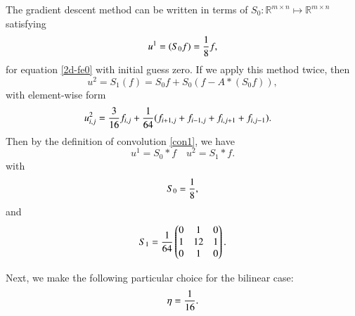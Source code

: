 The gradient descent method can be written in terms of $S_{0}:\mathbb
R^{m\times n}\mapsto \mathbb R^{m\times n}$ satisfying
\begin{equation}
\label{jacobi1}
u^1=(S_{0}f)={1\over 8} f,
\end{equation}
for equation \eqref{2d-fe0} with initial guess zero.
If we apply this method twice, then
$$
u^2=S_1(f) = S_{0} f + S_0(f - A\ast(S_{0}f)),
$$
with element-wise form
\begin{equation} 
\begin{aligned}
u^2_{i,j} &={3\over 16}f_{i,j} + {1\over 64}(f_{i+1,j}+f_{i-1,j}+f_{i,j+1}+f_{i,j-1}).
\end{aligned}
\end{equation}
Then by the definition of convolution \eqref{con1}, we have
 \begin{equation}\label{eq:convS}
u^1= S_{0}\ast f \quad u^2 = S_1 \ast f.
\end{equation}
with
\begin{equation}\label{eq:kernel-S}
S_{0} = {1 \over 8},
\end{equation}
and 
\begin{equation}\label{eq:kernel-S2}
S_1={1\over 64} \begin{pmatrix}
0 & 1 & 0 \\
1 & 12 & 1  \\
0 &1  & 0
\end{pmatrix}.
\end{equation}

Next, we make the following particular choice for the bilinear case:
\begin{equation}
  \label{eta}
\eta={1\over 16}.  
\end{equation}

